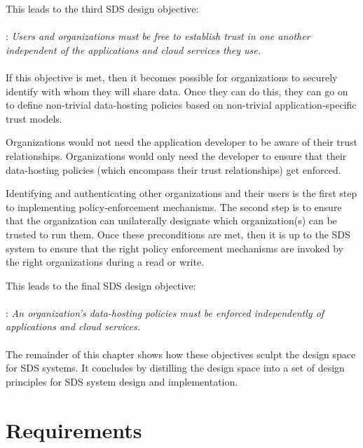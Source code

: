 This leads to the third SDS design objective:
\\
\\
: \emph{Users and organizations must be free to
establish trust in one another independent of the
applications and cloud services they use.}
\\
\\
If this objective is met, then it becomes possible for organizations to
securely identify with whom they will share data.  Once they can do this,
they can go on to define non-trivial data-hosting policies based on non-trivial
application-specific trust models.

Organizations would not need the application developer to be aware
of their trust relationships.  Organizations would only need the developer to
ensure that their data-hosting policies (which encompass their trust
relationships) get enforced.

Identifying and authenticating other organizations and their users
is the first step to implementing policy-enforcement mechanisms.
The second step is to ensure that the organization can unilaterally
designate which organization(s) can be trusted to run them.
Once these preconditions are met, then it is up to the SDS system to ensure that the right
policy enforcement mechanisms are invoked by the right organizations during a read or write.

This leads to the final SDS design objective:
\\
\\
: \emph{An organization's data-hosting policies
must be enforced independently of applications and cloud services.}
\\
\\
The remainder of this chapter shows how these objectives sculpt the design space
for SDS systems.  It concludes by distilling the design space into a set of
design principles for SDS system design and implementation.

\section{Requirements}

